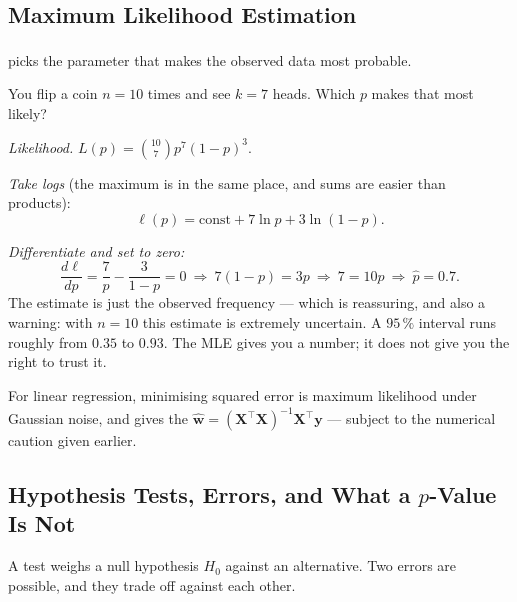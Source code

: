 \subsection{Maximum Likelihood Estimation}

 picks the parameter that makes the observed data
most probable\textsuperscript{\cite[][ch.~9]{wassermanAllStatistics2004}}.

\begin{workedexample}
You flip a coin $n=10$ times and see $k=7$ heads. Which $p$ makes that most
likely?

\emph{Likelihood.} $L(p) = \binom{10}{7}p^7(1-p)^3$.

\emph{Take logs} (the maximum is in the same place, and sums are easier than
products):
\[
  \ell(p) = \text{const} + 7\ln p + 3\ln(1-p).
\]

\emph{Differentiate and set to zero:}
\[
  \frac{d\ell}{dp} = \frac{7}{p} - \frac{3}{1-p} = 0
  \ \Longrightarrow\ 7(1-p) = 3p
  \ \Longrightarrow\ 7 = 10p
  \ \Longrightarrow\ \hat p = 0.7 .
\]
The estimate is just the observed frequency --- which is reassuring, and also a
warning: with $n=10$ this estimate is extremely uncertain. A $95\,\%$ interval
runs roughly from $0.35$ to $0.93$. The MLE gives you a number; it does not
give you the right to trust it.
\end{workedexample}

For linear regression, minimising squared error is maximum likelihood under
Gaussian noise, and gives the 
$\hat{\mathbf{w}} = (\mathbf{X}^{\!\top}\mathbf{X})^{-1}\mathbf{X}^{\!\top}
\mathbf{y}$\textsuperscript{\cite{jamesIntroductionStatisticalLearning2013}} ---
subject to the numerical caution given earlier.

\subsection{Hypothesis Tests, Errors, and What a $p$-Value Is Not}

A test weighs a null hypothesis $H_0$ against an alternative. Two errors are
possible, and they trade off against each other.

